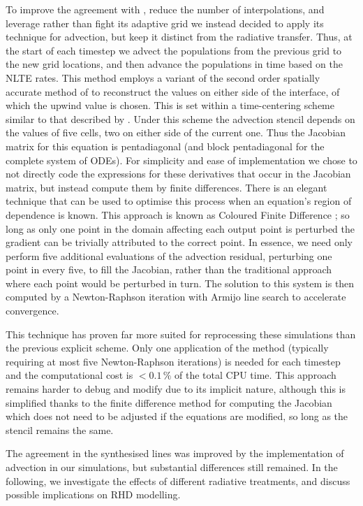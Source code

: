 To improve the agreement with \Radyn{}, reduce the number of interpolations, and leverage rather than fight its adaptive grid we instead decided to apply its technique for advection, but keep it distinct from the radiative transfer.
Thus, at the start of each timestep we advect the populations from the previous grid to the new grid locations, and then advance the populations in time based on the NLTE rates.
This method employs a variant of the second order spatially accurate method of \citet{VanLeer1979} to reconstruct the values on either side of the interface, of which the upwind value is chosen.
This is set within a time-centering scheme similar to that described by \citet{Dorfi1997}.
Under this scheme the advection stencil depends on the values of five cells, two on either side of the current one.
Thus the Jacobian matrix for this equation is pentadiagonal (and block pentadiagonal for the complete system of ODEs).
For simplicity and ease of implementation we chose to not directly code the expressions for these derivatives that occur in the Jacobian matrix, but instead compute them by finite differences.
There is an elegant technique that can be used to optimise this process when an equation's region of dependence is known.
This approach is known as Coloured Finite Difference \citep{Curtis1974}; so long as only one point in the domain affecting each output point is perturbed the gradient can be trivially attributed to the correct point.
In essence, we need only perform five additional evaluations of the advection residual, perturbing one point in every five, to fill the Jacobian, rather than the traditional approach where each point would be perturbed in turn.
The solution to this system is then computed by a Newton-Raphson iteration with Armijo line search \citep{Armijo1966} to accelerate convergence.

This technique has proven far more suited for reprocessing these simulations than the previous explicit scheme.
Only one application of the method (typically requiring at most five Newton-Raphson iterations) is needed for each timestep and the computational cost is $<0.1\,\%$ of the total CPU time.
This approach remains harder to debug and modify due to its implicit nature, although this is simplified thanks to the finite difference method for computing the Jacobian which does not need to be adjusted if the equations are modified, so long as the stencil remains the same.

The agreement in the synthesised lines was improved by the implementation of advection in our simulations, but substantial differences still remained.
In the following, we investigate the effects of different radiative treatments, and discuss possible implications on RHD modelling.


